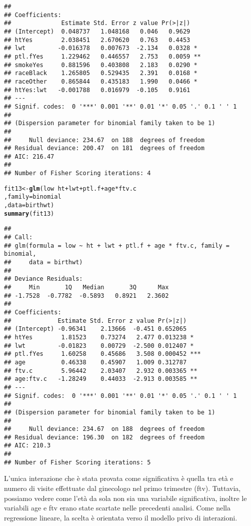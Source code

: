 \documentclass{article}\usepackage[]{graphicx}\usepackage[]{color}
\makeatletter
\newcommand{\hlopt}[1]{\textcolor[rgb]{0,0,0}{#1}}%
\newcommand{\hlstd}[1]{\textcolor[rgb]{0.345,0.345,0.345}{#1}}%
\newcommand{\hlkwb}[1]{\textcolor[rgb]{0.69,0.353,0.396}{#1}}%
\newcommand{\hlkwc}[1]{\textcolor[rgb]{0.333,0.667,0.333}{#1}}%
\newcommand{\hlkwd}[1]{\textcolor[rgb]{0.737,0.353,0.396}{\textbf{#1}}}%
\newenvironment{kframe}{%
 \def\at@end@of@kframe{}%
 \ifinner\ifhmode%
  \def\at@end@of@kframe{\end{minipage}}%
  \begin{minipage}{\columnwidth}%
 \fi\fi%
 \def\FrameCommand##1{\hskip\@totalleftmargin \hskip-\fboxsep
 \colorbox{shadecolor}{##1}\hskip-\fboxsep
     \hskip-\linewidth \hskip-\@totalleftmargin \hskip\columnwidth}%
 \MakeFramed {\advance\hsize-\width
   \@totalleftmargin\z@ \linewidth\hsize
   \@setminipage}}%
 {\par\unskip\endMakeFramed%
 \at@end@of@kframe}
\newenvironment{knitrout}{}{} %
\makeatother
\begin{document}
\begin{knitrout}
\begin{kframe}
\begin{verbatim}
## 
## Coefficients:
##              Estimate Std. Error z value Pr(>|z|)   
## (Intercept)  0.048737   1.048168   0.046   0.9629   
## htYes        2.038451   2.670620   0.763   0.4453   
## lwt         -0.016378   0.007673  -2.134   0.0328 * 
## ptl.fYes     1.229462   0.446557   2.753   0.0059 **
## smokeYes     0.881596   0.403808   2.183   0.0290 * 
## raceBlack    1.265805   0.529435   2.391   0.0168 * 
## raceOther    0.865844   0.435183   1.990   0.0466 * 
## htYes:lwt   -0.001788   0.016979  -0.105   0.9161   
## ---
## Signif. codes:  0 '***' 0.001 '**' 0.01 '*' 0.05 '.' 0.1 ' ' 1
## 
## (Dispersion parameter for binomial family taken to be 1)
## 
##     Null deviance: 234.67  on 188  degrees of freedom
## Residual deviance: 200.47  on 181  degrees of freedom
## AIC: 216.47
## 
## Number of Fisher Scoring iterations: 4
\end{verbatim}
\begin{alltt}
\hlstd{fit13} \hlkwb{<-} \hlkwd{glm}\hlstd{(low} \hlopt{~} \hlstd{ht} \hlopt{+} \hlstd{lwt} \hlopt{+} \hlstd{ptl.f} \hlopt{+} \hlstd{age} \hlopt{*} \hlstd{ftv.c}
             \hlstd{,} \hlkwc{family} \hlstd{= binomial}
             \hlstd{,} \hlkwc{data} \hlstd{= birthwt)}
\hlkwd{summary}\hlstd{(fit13)}
\end{alltt}
\begin{verbatim}
## 
## Call:
## glm(formula = low ~ ht + lwt + ptl.f + age * ftv.c, family = binomial, 
##     data = birthwt)
## 
## Deviance Residuals: 
##     Min       1Q   Median       3Q      Max  
## -1.7528  -0.7782  -0.5893   0.8921   2.3602  
## 
## Coefficients:
##             Estimate Std. Error z value Pr(>|z|)    
## (Intercept) -0.96341    2.13666  -0.451 0.652065    
## htYes        1.81523    0.73274   2.477 0.013238 *  
## lwt         -0.01823    0.00729  -2.500 0.012407 *  
## ptl.fYes     1.60258    0.45686   3.508 0.000452 ***
## age          0.46338    0.45907   1.009 0.312787    
## ftv.c        5.96442    2.03407   2.932 0.003365 ** 
## age:ftv.c   -1.28249    0.44033  -2.913 0.003585 ** 
## ---
## Signif. codes:  0 '***' 0.001 '**' 0.01 '*' 0.05 '.' 0.1 ' ' 1
## 
## (Dispersion parameter for binomial family taken to be 1)
## 
##     Null deviance: 234.67  on 188  degrees of freedom
## Residual deviance: 196.30  on 182  degrees of freedom
## AIC: 210.3
## 
## Number of Fisher Scoring iterations: 5
\end{verbatim}
\end{kframe}
\end{knitrout}

L'unica interazione che è stata provata come significativa è quella tra età e numero di visite effettuate dal ginecologo nel primo trimestre (ftv). 
Tuttavia, possiamo vedere come l'età da sola non sia una variabile significativa, inoltre le variabili age e ftv erano state scartate nelle precedenti analisi.
Come nella regressione lineare, la scelta è orientata verso il modello privo di interazioni.
\end{document}
